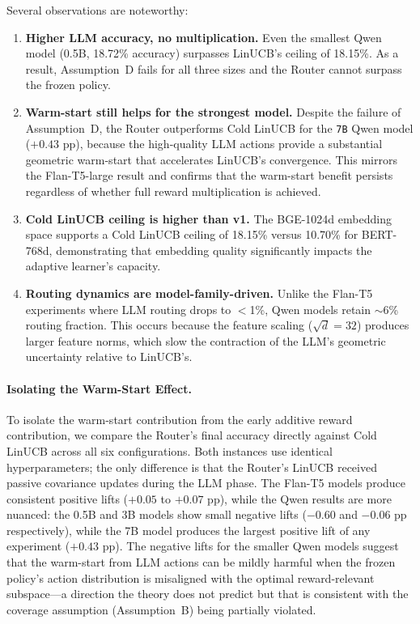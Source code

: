 Several observations are noteworthy:

\begin{enumerate}[nosep]
\item \textbf{Higher LLM accuracy, no multiplication.} Even the smallest Qwen model (0.5B, 18.72\% accuracy) surpasses LinUCB's ceiling of 18.15\%. As a result, Assumption~D fails for all three sizes and the Router cannot surpass the frozen policy.

\item \textbf{Warm-start still helps for the strongest model.} Despite the failure of Assumption~D, the Router outperforms Cold LinUCB for the \texttt{7B} Qwen model ($+0.43$ pp), because the high-quality LLM actions provide a substantial geometric warm-start that accelerates LinUCB's convergence. This mirrors the Flan-T5-large result and confirms that the warm-start benefit persists regardless of whether full reward multiplication is achieved.

\item \textbf{Cold LinUCB ceiling is higher than v1.} The BGE-1024d embedding space supports a Cold LinUCB ceiling of 18.15\% versus 10.70\% for BERT-768d, demonstrating that embedding quality significantly impacts the adaptive learner's capacity.

\item \textbf{Routing dynamics are model-family-driven.} Unlike the Flan-T5 experiments where LLM routing drops to $<$1\%, Qwen models retain $\sim$6\% routing fraction. This occurs because the feature scaling ($\sqrt{d}=32$) produces larger feature norms, which slow the contraction of the LLM's geometric uncertainty relative to LinUCB's.
\end{enumerate}

\paragraph{Isolating the Warm-Start Effect.}
To isolate the warm-start contribution from the early additive reward contribution, we compare the Router's final accuracy directly against Cold LinUCB across all six configurations. Both instances use identical hyperparameters; the only difference is that the Router's LinUCB received passive covariance updates during the LLM phase. The Flan-T5 models produce consistent positive lifts ($+0.05$ to $+0.07$ pp), while the Qwen results are more nuanced: the 0.5B and 3B models show small negative lifts ($-0.60$ and $-0.06$ pp respectively), while the 7B model produces the largest positive lift of any experiment ($+0.43$ pp). The negative lifts for the smaller Qwen models suggest that the warm-start from LLM actions can be mildly harmful when the frozen policy's action distribution is misaligned with the optimal reward-relevant subspace---a direction the theory does not predict but that is consistent with the coverage assumption (Assumption~B) being partially violated.

